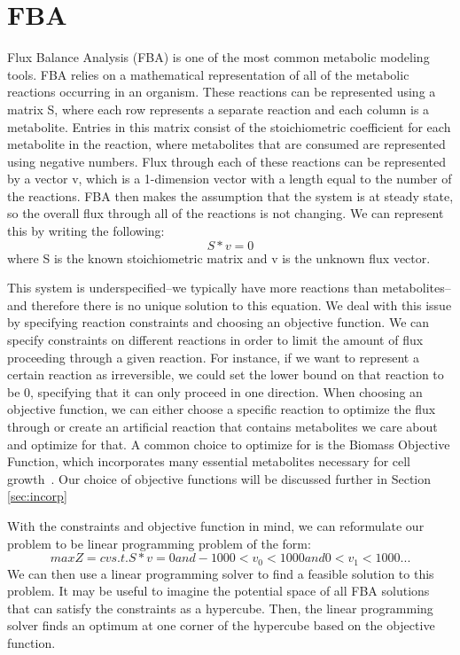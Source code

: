\section{FBA}
Flux Balance Analysis (FBA) is one of the most common metabolic modeling tools.
FBA relies on a mathematical representation of all of the metabolic reactions occurring in an organism.
These reactions can be represented using a matrix S, where each row represents a separate reaction and each column is a metabolite.
Entries in this matrix consist of the stoichiometric coefficient for each metabolite in the reaction, where metabolites that are consumed are represented using negative numbers.
Flux through each of these reactions can be represented by a vector v, which is a 1-dimension vector with a length equal to the number of the reactions.
FBA then makes the assumption that the system is at steady state, so the overall flux through all of the reactions is not changing.
We can represent this by writing the following:
\begin{equation}
S * v = 0
\end{equation}
where S is the known stoichiometric matrix and v is the unknown flux vector.

This system is underspecified--we typically have more reactions than metabolites--and therefore there is no unique solution to this equation.
We deal with this issue by specifying reaction constraints and choosing an objective function.
We can specify constraints on different reactions in order to limit the amount of flux proceeding through a given reaction.
For instance, if we want to represent a certain reaction as irreversible, we could set the lower bound on that reaction to be 0, specifying that it can only proceed in one direction.
When choosing an objective function, we can either choose a specific reaction to optimize the flux through or create an artificial reaction that contains metabolites we care about and optimize for that.
A common choice to optimize for is the Biomass Objective Function, which incorporates many essential metabolites necessary for cell growth~\cite{feist2010biomass}.
Our choice of objective functions will be discussed further in Section \ref{sec:incorp}

With the constraints and objective function in mind, we can reformulate our problem to be linear programming problem of the form:
\begin{equation}
max Z = cv
s.t. S * v = 0
and -1000 < v_0 < 1000
and 0 < v_1 < 1000
...
\end{equation}
We can then use a linear programming solver to find a feasible solution to this problem.
It may be useful to imagine the potential space of all FBA solutions that can satisfy the constraints as a hypercube.
Then, the linear programming solver finds an optimum at one corner of the hypercube based on the objective function.

